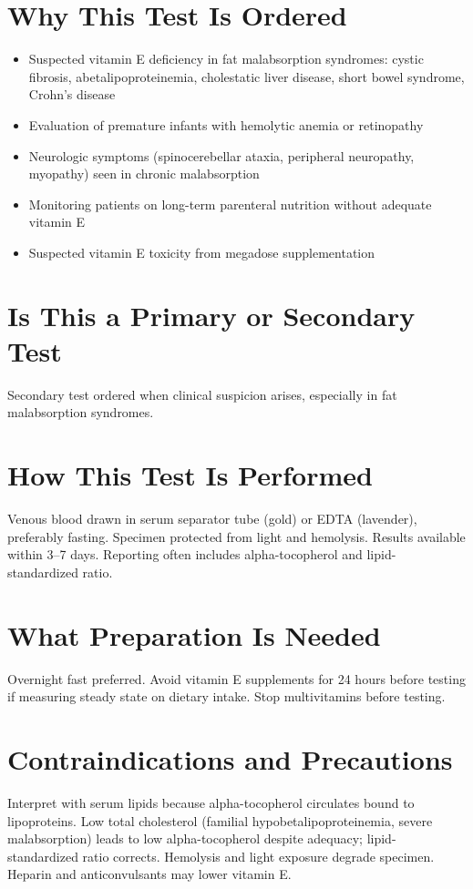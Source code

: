 \section*{Why This Test Is Ordered}
\begin{itemize}
  \item Suspected vitamin E deficiency in fat malabsorption syndromes: cystic fibrosis, abetalipoproteinemia, cholestatic liver disease, short bowel syndrome, Crohn's disease
  \item Evaluation of premature infants with hemolytic anemia or retinopathy
  \item Neurologic symptoms (spinocerebellar ataxia, peripheral neuropathy, myopathy) seen in chronic malabsorption
  \item Monitoring patients on long-term parenteral nutrition without adequate vitamin E
  \item Suspected vitamin E toxicity from megadose supplementation
\end{itemize}

\section*{Is This a Primary or Secondary Test}
Secondary test ordered when clinical suspicion arises, especially in fat malabsorption syndromes.

\section*{How This Test Is Performed}
Venous blood drawn in serum separator tube (gold) or EDTA (lavender), preferably fasting. Specimen protected from light and hemolysis. Results available within 3--7 days. Reporting often includes alpha-tocopherol and lipid-standardized ratio.

\section*{What Preparation Is Needed}
Overnight fast preferred. Avoid vitamin E supplements for 24 hours before testing if measuring steady state on dietary intake. Stop multivitamins before testing.

\section*{Contraindications and Precautions}
Interpret with serum lipids because alpha-tocopherol circulates bound to lipoproteins. Low total cholesterol (familial hypobetalipoproteinemia, severe malabsorption) leads to low alpha-tocopherol despite adequacy; lipid-standardized ratio corrects. Hemolysis and light exposure degrade specimen. Heparin and anticonvulsants may lower vitamin E.

